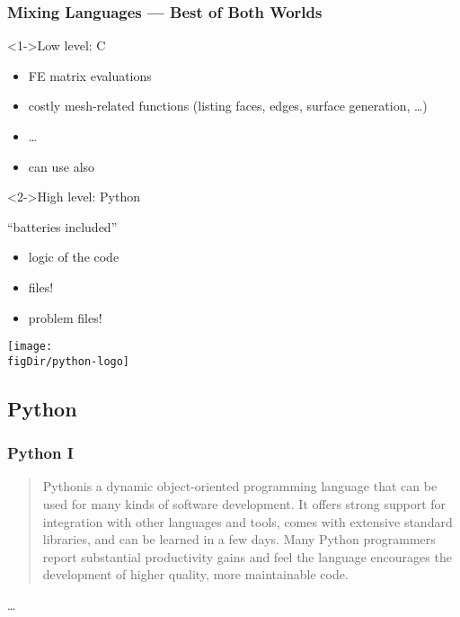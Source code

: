 \documentclass[10pt,t]{beamer}
\def\figDir{figures}
\newcommand{\red}[1]{{\color{red}{#1}}}
\newcommand{\blue}[1]{{\color{blue}{#1}}}
\newcommand{\lblue}[1]{{\color{lblue}{#1}}}
\begin{document}
\begin{frame}
\frametitle{Mixing Languages --- Best of Both Worlds}  
\begin{alertblock}<1->{Low level: C}
  \
  \begin{itemize}
  \item FE matrix evaluations
  \item costly mesh-related functions (listing faces, edges, surface
    generation, \dots)
  \item \dots
  \item can use also \red{fortran}
  \end{itemize}
\end{alertblock}
\begin{exampleblock}<2->{High level: Python}
  \centerline{\href{http://www.python.org}{\blue{www.python.org}}}
  \centerline{``batteries included''}
  \begin{minipage}{0.5\linewidth}
    \begin{itemize}
    \item logic of the code
    \item \lblue{configuration} files!
    \item problem \blue{input} files!
    \end{itemize}
  \end{minipage}
  \hfill
  \begin{minipage}{0.4\linewidth}
    \texttt{[image: \\figDir/python-logo]}
  \end{minipage}
\end{exampleblock}
\end{frame}

\subsection{Python}

\begin{frame}
  \frametitle{Python I}
  \begin{quotation}
    Python\textregistered is a dynamic object-oriented programming language
    that can be used for many kinds of software development. It offers strong
    support for integration with other languages and tools, comes with
    extensive standard libraries, and can be learned in a few days. Many Python
    programmers report substantial productivity gains and feel the language
    encourages the development of higher quality, more maintainable code.
  \end{quotation}
  \vspace*{10mm}
  \centerline{\dots}
  \vspace*{10mm}
  \centerline{\blue{``batteries included''}}
\end{frame}
\end{document}
